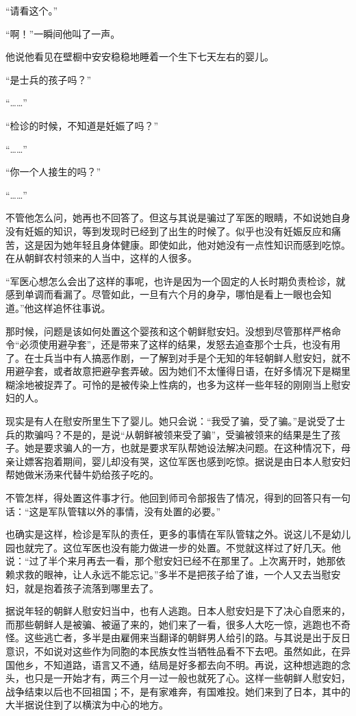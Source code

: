 \documentclass[12pt,UTF8]{ctexbook}
\begin{document}
“请看这个。”

“啊！”一瞬间他叫了一声。

他说他看见在壁橱中安安稳稳地睡着一个生下七天左右的婴儿。

“是士兵的孩子吗？”

“……”

“检诊的时候，不知道是妊娠了吗？”

“……”

“你一个人接生的吗？”

“……”

不管他怎么问，她再也不回答了。但这与其说是骗过了军医的眼睛，不如说她自身没有妊娠的知识，等到发现时已经到了出生的时候了。似乎也没有妊娠反应和痛苦，这是因为她年轻且身体健康。即使如此，他对她没有一点性知识而感到吃惊。在从朝鲜农村领来的人当中，这样的人很多。

“军医心想怎么会出了这样的事呢，也许是因为一个固定的人长时期负责检诊，就感到单调而看漏了。尽管如此，一旦有六个月的身孕，哪怕是看上一眼也会知道。”他这样追怀往事说。

那时候，问题是该如何处置这个婴孩和这个朝鲜慰安妇。没想到尽管那样严格命令“必须使用避孕套”，还是带来了这样的结果，发怒去追查那个士兵，也没有用了。在士兵当中有人搞恶作剧，一了解到对手是个无知的年轻朝鲜人慰安妇，就不用避孕套，或者故意把避孕套弄破。因为她们不太懂得日语，在好多情况下是糊里糊涂地被捉弄了。可怜的是被传染上性病的，也多为这样一些年轻的刚刚当上慰安妇的人。

现实是有人在慰安所里生下了婴儿。她只会说：“我受了骗，受了骗。”是说受了士兵的欺骗吗？不是的，是说“从朝鲜被领来受了骗”，受骗被领来的结果是生了孩子。她是要求骗人的一方，也就是要求军队帮她设法解决问题。在这种情况下，母亲让嫖客抱着期间，婴儿却没有哭，这位军医也感到吃惊。据说是由日本人慰安妇帮她做米汤来代替牛奶给孩子吃的。

不管怎样，得处置这件事才行。他回到师司令部报告了情况，得到的回答只有一句话：“这是军队管辖以外的事情，没有处置的必要。”

也确实是这样，检诊是军队的责任，更多的事情在军队管辖之外。说这儿不是幼儿园也就完了。这位军医也没有能力做进一步的处置。不觉就这样过了好几天。他说：“过了半个来月再去一看，那个慰安妇已经不在那里了。上次离开时，她那依赖求救的眼神，让人永远不能忘记。”多半不是把孩子给了谁，一个人又去当慰安妇，就是抱着孩子流落到哪里去了。

据说年轻的朝鲜人慰安妇当中，也有人逃跑。日本人慰安妇是下了决心自愿来的，而那些朝鲜人是被骗、被逼了来的，她们来了一看，很多人大吃一惊，逃跑也不奇怪。这些逃亡者，多半是由雇佣来当翻译的朝鲜男人给引的路。与其说是出于反日意识，不如说对这些作为同胞的本民族女性当牺牲品看不下去吧。虽然如此，在异国他乡，不知道路，语言又不通，结局是好多都去向不明。再说，这种想逃跑的念头，也只是一开始才有，两三个月一过一般也就死了心。这样一些朝鲜人慰安妇，战争结束以后也不回祖国；不，是有家难奔，有国难投。她们来到了日本，其中的大半据说住到了以横滨为中心的地方。
\end{document}
